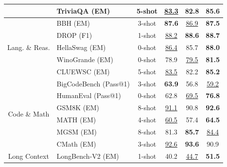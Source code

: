 \begin{table}[!h]
\begin{tabular}{@{}c l c | c c c@{}}
    & TriviaQA {\tiny (EM)} & 5-shot & \underline{83.3} & 82.8 & \textbf{85.6} \\
    \midrule
    \multirow{5}{*}{Lang. \& Reas.}
    & BBH {\tiny (EM)} & 3-shot & \textbf{87.6} & \underline{86.9} & \textbf{87.5} \\
    & DROP {\tiny (F1)} & 1-shot & \underline{88.2} & \textbf{88.6} & \textbf{88.7} \\
    & HellaSwag {\tiny (EM)} & 0-shot & \underline{86.4} & 85.7 & \textbf{88.0} \\
    & WinoGrande {\tiny (EM)} & 0-shot & 78.9 & \underline{79.5} & \textbf{81.5} \\
    & CLUEWSC {\tiny (EM)} & 5-shot & \underline{83.5} & 82.2 & \textbf{85.2} \\
    \midrule
    \multirow{6}{*}{Code \& Math}
    & BigCodeBench {\tiny (Pass@1)} & 3-shot & \textbf{63.9} & 56.8 & \underline{59.2} \\
    & HumanEval {\tiny (Pass@1)} & 0-shot & 62.8 & \underline{69.5} & \textbf{76.8} \\
    & GSM8K {\tiny (EM)} & 8-shot & \underline{91.1} & 90.8 & \textbf{92.6} \\
    & MATH {\tiny (EM)} & 4-shot & \underline{60.5} & 57.4 & \textbf{64.5} \\
    & MGSM {\tiny (EM)} & 8-shot & 81.3 & \textbf{85.7} & \underline{84.4} \\
    & CMath {\tiny (EM)} & 3-shot & \underline{92.6} & \textbf{93.6} & 90.9 \\
    \midrule
    \multirow{1}{*}{Long Context}
    & LongBench-V2 {\tiny (EM)} & 1-shot & 40.2 & \underline{44.7} & \textbf{51.5} \\
    \bottomrule
    \end{tabular}
    \label{tab:base}
\end{table}